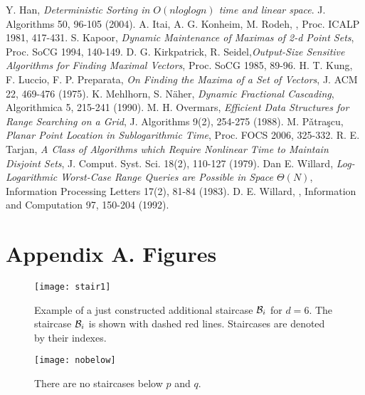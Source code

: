 \documentclass[10pt]{llncs}
\newcommand{\cB}{{\cal B}}
\begin{document}
\begin{thebibliography}{99}
Y. Han, {\em Deterministic Sorting in $O(nloglogn)$ time and linear space}. 
J. Algorithms 50, 96-105 (2004).
  A. Itai, A. G. Konheim, M. Rodeh, 
,
\newblock   Proc.  ICALP 1981, 417-431.
 S. Kapoor, {\em Dynamic Maintenance of Maximas of 2-d Point Sets},  Proc.  SoCG 1994, 140-149.
D. G. Kirkpatrick, R. Seidel,{\em Output-Size Sensitive Algorithms for Finding 
Maximal Vectors}, Proc. SoCG 1985,  89-96.
H. T. Kung, F. Luccio, F. P. Preparata, {\em  On Finding the Maxima of a Set of Vectors}, J. ACM 22, 469-476 (1975).
K. Mehlhorn, S. N\"aher, {\em Dynamic Fractional Cascading}, 
Algorithmica 5, 215-241 (1990).
M. H. Overmars, {\em Efficient Data Structures for Range Searching on a Grid}, J. Algorithms 9(2),  254-275 (1988).
M. P\v{a}tra\c{s}cu, {\em Planar Point Location in Sublogarithmic Time}, 
Proc. FOCS 2006, 325-332.
 R. E. Tarjan, 
{\em A Class of Algorithms which Require Nonlinear Time to Maintain Disjoint
 Sets}, 
J. Comput. Syst. Sci. 18(2), 110-127 (1979).
Dan E. Willard, {\em  Log-Logarithmic Worst-Case Range Queries are Possible in
 Space $\Theta(N)$},
Information  Processing Letters 17(2), 81-84 (1983).
D. E. Willard,
, 
\newblock Information and  Computation 97, 150-204 (1992).
\end{thebibliography}

\newpage 


\section*{Appendix A. Figures}




\begin{figure}[htb]
  \centering
  \texttt{[image: stair1]}
\caption{
  Example of a just constructed additional staircase $\cB_i$ for $d=6$. 
  The staircase $\cB_i$ is shown with dashed red lines. 
  Staircases are denoted by their indexes. 
 }
  \label{fig:stair1}
\end{figure} 

\begin{figure}[bt]
  \centering
\texttt{[image: nobelow]}
\caption{There are no staircases below $p$ and $q$.}
\label{fig:nobelow}
\end{figure}
\end{document}
